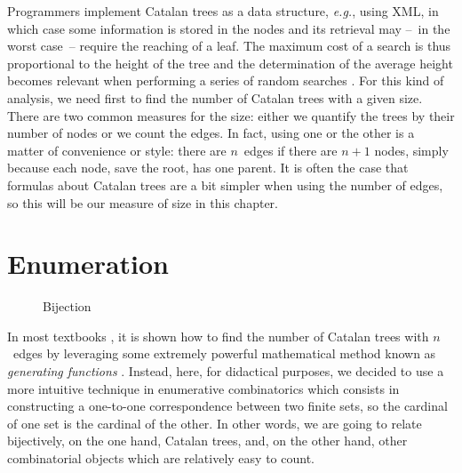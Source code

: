 Programmers implement Catalan trees as a data structure, \emph{e.g.},
using \textsf{XML}, in which case some information is stored in the
nodes and its retrieval may --~in the worst case~-- require the
reaching of a leaf. The maximum cost of a search is thus proportional
to the height of the tree and the determination of the average height
becomes relevant when performing a series of random searches
\citep{VitterFlajolet_1990}. For this kind of analysis, we need first
to find the number of Catalan trees with a given size. There are two
common measures for the size: either we quantify the trees by their
number of nodes or we count the edges. In fact, using one or the other
is a matter of convenience or style: there are \(n\)~edges if there
are \(n+1\) nodes, simply because each node, save the root, has one
parent. It is often the case that formulas about Catalan trees are a
bit simpler when using the number of edges, so this will be our
measure of size in this chapter.

\section{Enumeration}
\label{sec:Catalan_enumeration}

%
\begin{wrapfigure}[10]{r}[0pt]{0pt}
\hspace*{0pt} %
\centering
{} %
\quad
\subfloat[Catalan tree\label{fig:ctree}]{%
\texttt{[image: ctree]} %
}
\caption{Bijection}
\label{fig:bijection}
\end{wrapfigure}
In most textbooks \cite[\S~5.1 \&~5.2]{SedgewickFlajolet_1996}, it is
shown how to find the number of Catalan trees with \(n\)~edges by
leveraging some extremely powerful mathematical method known as
\emph{generating functions} \cite[chap.~7]{GrahamKnuthPatashnik_1994}. Instead, here,
for didactical purposes, we decided to use a more intuitive technique
in enumerative combinatorics which
consists in constructing a one\hyp{}to\hyp{}one correspondence between
two finite sets, so the cardinal of one set is the cardinal of the
other. In other words, we are going to relate bijectively, on the one
hand, Catalan trees, and, on the other hand, other combinatorial
objects which are relatively easy to count.

